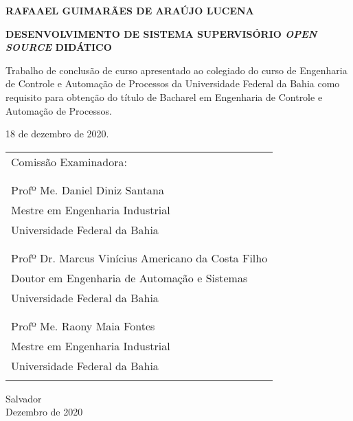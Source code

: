 \begin{center}
\noindent \uppercase{\textbf{Rafaael Guimarães de Araújo Lucena}}
\end{center}

\vspace*{8mm}

\begin{center}
\noindent \uppercase{\textbf{Desenvolvimento de sistema supervisório \emph{open source} didático}}
\end{center}

\vspace*{4mm}

\begin{flushleft}
\noindent Trabalho de conclusão de curso apresentado ao
colegiado do curso de Engenharia de Controle e
Automação de Processos da Universidade Federal
da Bahia como requisito para obtenção do título
de Bacharel em Engenharia de Controle e
Automação de Processos.
\end{flushleft}
\begin{flushright}
	18 de dezembro de 2020.
\end{flushright}

\vspace*{4mm}

\begin{tabular}{@{}p{4in}@{}}
	Comissão Examinadora:\\\\
	\hrulefill \\
	Profº Me. Daniel Diniz Santana \\
	Mestre em Engenharia Industrial \\
	Universidade Federal da Bahia \\\\
	
	\hrulefill \\
	Profº Dr. Marcus Vinícius Americano da Costa Filho \\
	Doutor em Engenharia de Automação e Sistemas \\
	Universidade Federal da Bahia \\\\
	
	\hrulefill \\
	Profº Me. Raony Maia Fontes \\
	Mestre em Engenharia Industrial \\
	Universidade Federal da Bahia \\\\
\end{tabular}

\vspace*{\fill}

\begin{center}
	Salvador \\
	Dezembro de 2020
\end{center}